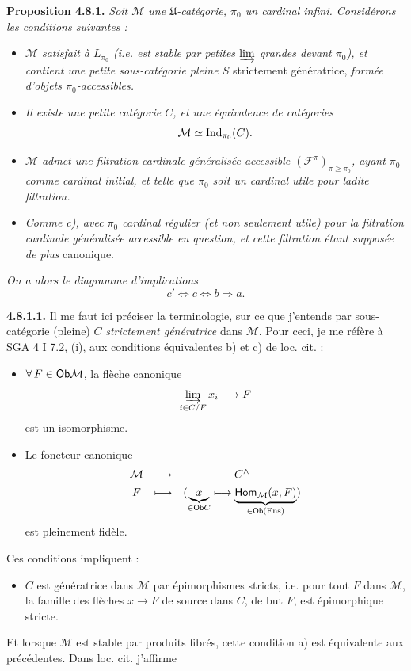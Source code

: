 \textbf{Proposition 4.8.1.} \textit{Soit $\mathcal{M}$ une $\mathfrak{U}$-catégorie, $\pi_0$ un cardinal infini. Considérons les conditions suivantes :}
\begin{itemize}[label={}]
\item[\textit{a)}] \textit{$\mathcal{M}$ satisfait à $L_{\pi_0}$ (i.e. est stable par petites $\varinjlim$ grandes devant $\pi_0$), et contient une petite sous-catégorie pleine $S$} strictement génératrice, \textit{formée d'objets $\pi_0$-accessibles.}
\item[\textit{b)}] \textit{Il existe une petite catégorie $C$, et une équivalence de catégories}
\[ \mathcal{M} \simeq \operatorname{Ind}_{\pi_0}(C) . \]
\item[\textit{c)}] \textit{$\mathcal{M}$ admet une filtration cardinale généralisée accessible $(\mathcal{F}^\pi)_{\pi\geqslant\pi_0}$, ayant $\pi_0$ comme cardinal initial, et telle que $\pi_0$ soit un cardinal utile pour ladite filtration.}
\end{itemize}


\begin{itemize}[label={}]
\item[\textit{c$'$)}] \textit{Comme c), avec $\pi_0$ cardinal régulier (et non seulement utile) pour la filtration cardinale généralisée accessible en question, et cette filtration étant supposée de plus} canonique.
\end{itemize}
\textit{On a alors le diagramme d'implications}
\[ c' \Longleftrightarrow c \Longleftrightarrow b \Longrightarrow a . \]

\textbf{4.8.1.1.} Il me faut ici préciser la terminologie, sur ce que j'entends par sous-catégorie (pleine) $C$ \textit{strictement génératrice} dans $\mathcal{M}$. Pour ceci, je me réfère à SGA 4 I 7.2, (i), aux conditions équivalentes b) et c) de loc. cit. :
\begin{itemize}[label={}]
\item[\circled{b}] $\forall\, F \in \mathsf{Ob} \mathcal{M}$, la flèche canonique
\[ \varinjlim_{i\in C/F} x_i \longrightarrow F \]
est un isomorphisme.
\item[\circled{c}] Le foncteur canonique
\[ \begin{array}{ccc}
\mathcal{M} & \longrightarrow & C^{\wedge} \\[1ex]
F & \longmapsto & (\underbrace{x}_{\in \mathsf{Ob} C} \longmapsto \underbrace{\mathsf{Hom}_{\mathcal{M}}(x,F)}_{\in \mathsf{Ob} (\mathrm{Ens})})
\end{array} \]
est pleinement fidèle.
\end{itemize}
Ces conditions impliquent :
\begin{itemize}[label={}]
\item[a)] $C$ est génératrice dans $\mathcal{M}$ par épimorphismes stricts, i.e. pour tout $F$ dans $\mathcal{M}$, la famille des flèches $x \longrightarrow F$ de source dans $C$, de but $F$, est épimorphique stricte.
\end{itemize}
Et lorsque $\mathcal{M}$ est stable par produits fibrés, cette condition a) est équivalente aux précédentes. Dans loc. cit. j'affirme

